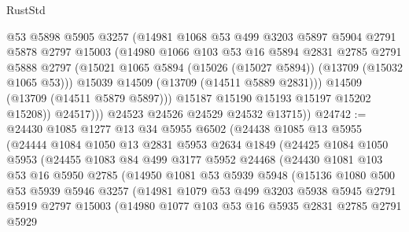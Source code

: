 \begin{lexlean}{RustStd}
\begin{coremodule}
                  @53
                  @5898
                  @5905
                  @3257
                  (@14981
                    @1068
                    @53
                    @499
                    @3203
                    @5897
                    @5904
                    @2791
                    @5878
                    @2797
                    @15003
                    (@14980
                      @1066
                      @103
                      @53
                      @16
                      @5894
                      @2831
                      @2785
                      @2791
                      @5888
                      @2797
                      (@15021 @1065 @5894 (@15026 (@15027 @5894)) (@13709 (@15032 @1065 @53)))
                      @15039
                      @14509
                      (@13709 (@14511 @5889 @2831)))
                    @14509
                    (@13709 (@14511 @5879 @5897)))
                  @15187
                  @15190
                  @15193
                  @15197
                  @15202
                  @15208))
              @24517)))
        @24523
        @24526
        @24529
        @24532
        @13715))
@24742 := @24430
    @1085
    @1277
    @13
    @34
    @5955
    @6502
    (@24438
      @1085
      @13
      @5955
      (@24444
        @1084
        @1050
        @13
        @2831
        @5953
        @2634
        @1849
        (@24425
          @1084
          @1050
          @5953
          (@24455
            @1083
            @84
            @499
            @3177
            @5952
            @24468
            (@24430
              @1081
              @103
              @53
              @16
              @5950
              @2785
              (@14950
                @1081
                @53
                @5939
                @5948
                (@15136
                  @1080
                  @500
                  @53
                  @5939
                  @5946
                  @3257
                  (@14981
                    @1079
                    @53
                    @499
                    @3203
                    @5938
                    @5945
                    @2791
                    @5919
                    @2797
                    @15003
                    (@14980
                      @1077
                      @103
                      @53
                      @16
                      @5935
                      @2831
                      @2785
                      @2791
                      @5929

\end{coremodule}
\end{lexlean}
